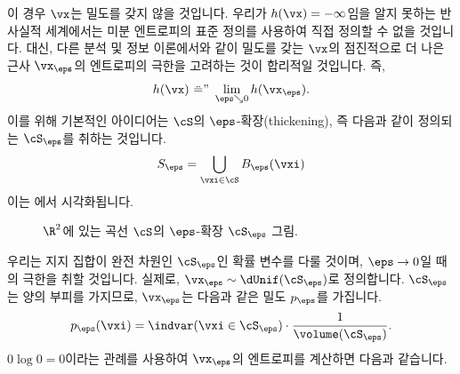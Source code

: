 \documentclass[../../book-main_ko.tex]{subfiles}
\begin{document}
이 경우 \(\vx\)는 밀도를 갖지 않을 것입니다. 우리가 \(h(\vx) = -\infty\)임을 알지 못하는 반사실적 세계에서는 미분 엔트로피의 표준 정의를 사용하여 직접 정의할 수 없을 것입니다. 대신, 다른 분석 및 정보 이론에서와 같이 밀도를 갖는 \(\vx\)의 점진적으로 더 나은 근사 \(\vx_{\eps}\)의 엔트로피의 극한을 고려하는 것이 합리적일 것입니다. 즉,
\begin{equation}
    h(\vx)\ \text{\"=''}\ \lim_{\eps \searrow 0}h(\vx_{\eps}).
\end{equation}
이를 위해 기본적인 아이디어는 \(\cS\)의 \(\eps\)-확장(thickening), 즉 다음과 같이 정의되는 \(\cS_{\eps}\)를 취하는 것입니다.
\begin{equation}
    S_{\eps} = \bigcup_{\vxi \in \cS}B_{\eps}(\vxi)
\end{equation}
이는 에서 시각화됩니다.
\begin{figure}[th]
    \centering
    \caption{\(\R^{2}\)에 있는 곡선 \(\cS\)의 \(\eps\)-확장 \(\cS_\eps\) 그림.}
    \label{fig:entropy_eps_thickening}
\end{figure}
우리는 지지 집합이 완전 차원인 \(\cS_{\eps}\)인 확률 변수를 다룰 것이며, \(\eps \to 0\)일 때의 극한을 취할 것입니다. 실제로, \(\vx_{\eps} \sim \dUnif(\cS_{\eps})\)로 정의합니다. \(\cS_{\eps}\)는 양의 부피를 가지므로, \(\vx_{\eps}\)는 다음과 같은 밀도 \(p_{\eps}\)를 가집니다.
\begin{equation}
    p_{\eps}(\vxi) = \indvar(\vxi \in \cS_{\eps}) \cdot \frac{1}{\volume(\cS_{\eps})}.
\end{equation}
\(0 \log 0 = 0\)이라는 관례를 사용하여 \(\vx_{\eps}\)의 엔트로피를 계산하면 다음과 같습니다.
\end{document}
